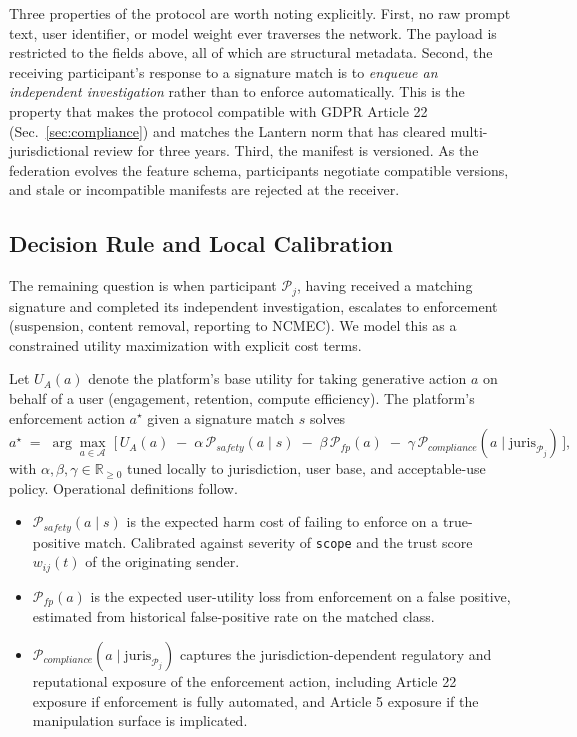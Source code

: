 \documentclass[11pt]{article}
\begin{document}
Three properties of the protocol are worth noting explicitly. First, no raw prompt text, user identifier, or model weight ever traverses the network. The payload is restricted to the fields above, all of which are structural metadata. Second, the receiving participant's response to a signature match is to \emph{enqueue an independent investigation} rather than to enforce automatically. This is the property that makes the protocol compatible with GDPR Article 22 (Sec.~\ref{sec:compliance}) and matches the Lantern norm that has cleared multi-jurisdictional review for three years. Third, the manifest is versioned. As the federation evolves the feature schema, participants negotiate compatible versions, and stale or incompatible manifests are rejected at the receiver.

\subsection{Decision Rule and Local Calibration}
\label{sec:decision}

The remaining question is when participant $\mathcal{P}_j$, having received a matching signature and completed its independent investigation, escalates to enforcement (suspension, content removal, reporting to NCMEC). We model this as a constrained utility maximization with explicit cost terms.

Let $U_A(a)$ denote the platform's base utility for taking generative action $a$ on behalf of a user (engagement, retention, compute efficiency). The platform's enforcement action $a^\star$ given a signature match $s$ solves
\[
a^\star \;=\; \arg\max_{a \in \mathcal{A}} \;\big[\, U_A(a) \;-\; \alpha\,\mathcal{P}_\mathit{safety}(a \mid s) \;-\; \beta\,\mathcal{P}_\mathit{fp}(a) \;-\; \gamma\,\mathcal{P}_\mathit{compliance}(a \mid \text{juris}_{\mathcal{P}_j})\,\big],
\]
with $\alpha, \beta, \gamma \in \mathbb{R}_{\geq 0}$ tuned locally to jurisdiction, user base, and acceptable-use policy. Operational definitions follow.
\begin{itemize}[leftmargin=1.5em]
\item $\mathcal{P}_\mathit{safety}(a \mid s)$ is the expected harm cost of failing to enforce on a true-positive match. Calibrated against severity of \texttt{scope} and the trust score $w_{ij}(t)$ of the originating sender.
\item $\mathcal{P}_\mathit{fp}(a)$ is the expected user-utility loss from enforcement on a false positive, estimated from historical false-positive rate on the matched class.
\item $\mathcal{P}_\mathit{compliance}(a \mid \text{juris}_{\mathcal{P}_j})$ captures the jurisdiction-dependent regulatory and reputational exposure of the enforcement action, including Article 22 exposure if enforcement is fully automated, and Article 5 exposure if the manipulation surface is implicated.
\end{itemize}
\end{document}
